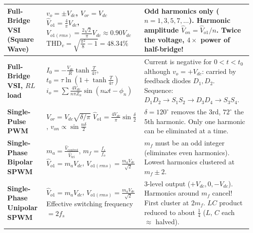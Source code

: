 \documentclass[11pt,a4paper]{article}
\begin{document}
\begin{table}[htbp]
\begin{tabularx}{\textwidth}{l p{5.5cm} X}
\midrule
\textbf{Full-Bridge VSI (Square Wave)} &
$v_o = \pm V_{dc}$, \quad $V_{or} = V_{dc}$ \newline
$\hat{V}_{o1} = \frac{4}{\pi}V_{dc}$, \quad $V_{o1(rms)} = \frac{2\sqrt{2}}{\pi}V_{dc} \approx 0.90 V_{dc}$ \newline
$\text{THD}_v = \sqrt{\frac{\pi^2}{8}-1} = 48.34\%$ &
Odd harmonics only ($n=1, 3, 5, 7, \dots$). \newline
Harmonic amplitude $\hat{V}_{on} = \hat{V}_{o1}/n$. \newline
Twice the voltage, $4\times$ power of half-bridge! \\
\midrule
\textbf{Full-Bridge VSI, $RL$ load} &
$I_0 = -\frac{V_{dc}}{R}\tanh\frac{T}{4\tau}$, \quad $t_0 = \tau\ln\left(1 + \tanh\frac{T}{4\tau}\right)$ \newline
$i_o = \sum \frac{4V_{dc}}{n\pi Z_n}\sin(n\omega t - \phi_n)$ &
Current is negative for $0<t<t_0$ although $v_o = +V_{dc}$: carried by feedback diodes $D_1, D_2$. \newline
Sequence: $D_1D_2 \to S_1S_2 \to D_3D_4 \to S_3S_4$. \\
\midrule
\textbf{Single-Pulse PWM} &
$V_{or} = V_{dc}\sqrt{\delta/\pi}$ \newline
$\hat{V}_{o1} = \frac{4V_{dc}}{\pi}\sin\frac{\delta}{2}$, \quad $v_{on} \propto \sin\frac{n\delta}{2}$ &
$\delta = 120^\circ$ removes the 3rd, $72^\circ$ the 5th harmonic. \newline
Only one harmonic can be eliminated at a time. \\
\midrule
\textbf{Single-Phase Bipolar SPWM} &
$m_a = \frac{\hat{V}_{\text{control}}}{\hat{V}_{\text{tri}}}$, \quad $m_f = \frac{f_s}{f_o}$ \newline
$\hat{V}_{o1} = m_a V_{dc}$, \quad $V_{o1(rms)} = \frac{m_a V_{dc}}{\sqrt{2}}$ &
$m_f$ must be an odd integer (eliminates even harmonics). \newline
Lowest harmonics clustered at $m_f \pm 2$. \\
\midrule
\textbf{Single-Phase Unipolar SPWM} &
$\hat{V}_{o1} = m_a V_{dc}$, \quad $V_{o1(rms)} = \frac{m_a V_{dc}}{\sqrt{2}}$ \newline
Effective switching frequency $= 2f_s$ &
3-level output ($+V_{dc}, 0, -V_{dc}$). \newline
Harmonics around $m_f$ cancel! First cluster at $2m_f$. \newline
$LC$ product reduced to about $\frac{1}{4}$ ($L$, $C$ each $\approx$ halved). \\
\bottomrule
\end{tabularx}
\end{table}
\end{document}
